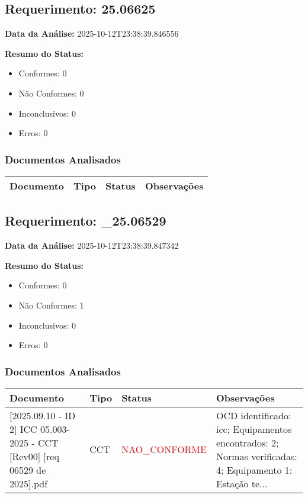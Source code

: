 \documentclass[12pt,a4paper]{article}
\begin{document}
\subsection{Requerimento: 25.06625}

\textbf{Data da Análise:} 2025-10-12T23:38:39.846556

\textbf{Resumo do Status:}
\begin{itemize}
    \item Conformes: 0
    \item Não Conformes: 0
    \item Inconclusivos: 0
    \item Erros: 0
\end{itemize}

\subsubsection{Documentos Analisados}

\begin{longtable}{|p{4cm}|p{2cm}|p{2cm}|p{6cm}|}
\hline
\textbf{Documento} & \textbf{Tipo} & \textbf{Status} & \textbf{Observações} \\
\hline
\endhead
\end{longtable}


\subsection{Requerimento: \_25.06529}

\textbf{Data da Análise:} 2025-10-12T23:38:39.847342

\textbf{Resumo do Status:}
\begin{itemize}
    \item Conformes: 0
    \item Não Conformes: 1
    \item Inconclusivos: 0
    \item Erros: 0
\end{itemize}

\subsubsection{Documentos Analisados}

\begin{longtable}{|p{4cm}|p{2cm}|p{2cm}|p{6cm}|}
\hline
\textbf{Documento} & \textbf{Tipo} & \textbf{Status} & \textbf{Observações} \\
\hline
\endhead
[Certificado de Conformidade Técnica - CCT][2025.09.10 - ID 2] ICC 05.003-2025 - CCT [Rev00] [req 06529 de 2025].pdf & CCT & \textcolor{red}{NAO\_CONFORME} & OCD identificado: icc; Equipamentos encontrados: 2; Normas verificadas: 4; Equipamento 1: Estação te... \\
\hline
\end{longtable}
\end{document}
